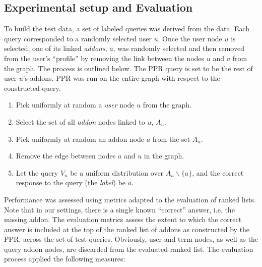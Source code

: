 \documentclass[10pt,letterpaper]{article}
\begin{document}
\subsection*{Experimental setup and Evaluation}

To build the test data, a set of labeled queries was derived from the data. Each query corresponded to a randomly selected user $u$. Once the user node $u$ is selected, one of its linked \textit{addons}, $a$, was randomly selected and then removed from the user's ``profile'' by removing the link between the nodes $u$ and $a$ from the graph. The process is outlined below. The PPR query is set to be the rest of user $u$'s addons. PPR was run on the entire graph with respect to the constructed query.

\begin{enumerate}
\item Pick uniformly at random a \textit{user} node $u$ from the graph. 
\item Select the set of all \textit{addon} nodes linked to $u$, $A_u$. 
\item Pick uniformly at random an addon node $a$ from the set $A_u$. 
\item Remove the edge between nodes $a$ and $u$ in the graph. 
\item Let the query $V_u$ be a uniform distribution over $A_u\backslash \{a\}$, and the correct response to the query (the \textit{label}) be $a$.  
\end{enumerate}

Performance was assessed using metrics adapted to the evaluation of ranked lists. Note that in our settings, there is a single known ``correct'' answer, i.e. the missing addon. The evaluation metrics assess the extent to which the correct answer is included at the top of the ranked list of addons as constructed by the PPR, across the set of test queries. Obviously, user and term nodes, as well as the query addon nodes, are discarded from the evaluated ranked list. The evaluation process applied the following measures:
\end{document}

